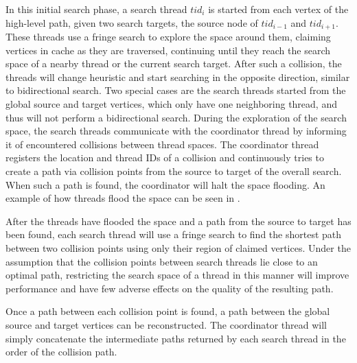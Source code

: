 \label{par:space-flooding} 
In this initial search phase, a search thread $tid_i$ is started from each vertex of the high-level path, given two search targets, the source node of $tid_{i - 1}$ and $tid_{i + 1}$. 
These threads use a fringe search to explore the space around them, claiming vertices in cache as they are traversed, continuing until they reach the search space of a nearby thread or the current search target. 
After such a collision, the threads will change heuristic and start searching in the opposite direction, similar to bidirectional search. 
Two special cases are the search threads started from the global source and target vertices, which only have one neighboring thread, and thus will not perform a bidirectional search. During the exploration of the search space, the search threads communicate with the coordinator thread by informing it of encountered collisions between thread spaces. The coordinator thread registers the location and thread IDs of a collision and continuously tries to create a path via collision points from the source to target of the overall search. When such a path is found, the coordinator will halt the space flooding. An example of how threads flood the space can be seen in .

After the threads have flooded the space and a path from the source to target has been found, each search thread will use a fringe search to find the shortest path between two collision points using only their region of claimed vertices. Under the assumption that the collision points between search threads lie close to an optimal path, restricting the search space of a thread in this manner will improve performance and have few adverse effects on the quality of the resulting path.

Once a path between each collision point is found, a path between the global source and target vertices can be reconstructed. 
The coordinator thread will simply concatenate the intermediate paths returned by each search thread in the order of the collision path.
